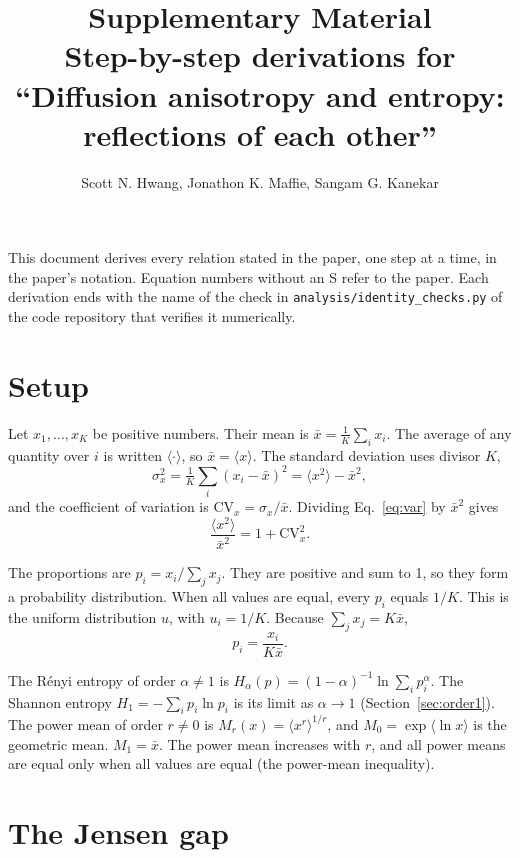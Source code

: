 \documentclass[11pt]{article}
\title{Supplementary Material\\[4pt]
\large Step-by-step derivations for ``Diffusion anisotropy and entropy: reflections of each other''}
\author{Scott N. Hwang, Jonathon K. Maffie, Sangam G. Kanekar}
\date{}
\newcommand{\CV}{\mathrm{CV}}
\begin{document}
\maketitle

This document derives every relation stated in the paper, one step at a time, in the paper's notation.
Equation numbers without an S refer to the paper. Each derivation ends with the name of the check in
\texttt{analysis/identity\_checks.py} of the code repository that verifies it numerically.

\section{Setup}

Let $x_1,\ldots,x_K$ be positive numbers. Their mean is $\bar x = \frac1K\sum_i x_i$. The average of any
quantity over $i$ is written $\langle\cdot\rangle$, so $\bar x = \langle x\rangle$. The standard deviation uses
divisor $K$,
\begin{equation}
\sigma_x^2 = \tfrac1K\textstyle\sum_i (x_i-\bar x)^2 = \langle x^2\rangle - \bar x^2 ,
\label{eq:var}
\end{equation}
and the coefficient of variation is $\CV_x = \sigma_x/\bar x$. Dividing Eq.~\eqref{eq:var} by $\bar x^2$ gives
\begin{equation}
\frac{\langle x^2\rangle}{\bar x^2} = 1 + \CV_x^2 .
\label{eq:secondmoment}
\end{equation}

The proportions are $p_i = x_i/\sum_j x_j$. They are positive and sum to 1, so they form a probability
distribution. When all values are equal, every $p_i$ equals $1/K$. This is the uniform distribution $u$, with
$u_i = 1/K$. Because $\sum_j x_j = K\bar x$,
\begin{equation}
p_i = \frac{x_i}{K\bar x} .
\label{eq:p}
\end{equation}

The R\'enyi entropy of order $\alpha\ne1$ is $H_\alpha(p) = (1-\alpha)^{-1}\ln\sum_i p_i^{\alpha}$. The Shannon
entropy $H_1 = -\sum_i p_i\ln p_i$ is its limit as $\alpha\to1$ (Section~\ref{sec:order1}). The power mean of
order $r\ne0$ is $M_r(x) = \langle x^r\rangle^{1/r}$, and $M_0 = \exp\langle\ln x\rangle$ is the geometric mean.
$M_1 = \bar x$. The power mean increases with $r$, and all power means are equal only when all values are equal
(the power-mean inequality).

\section{The Jensen gap}
\end{document}
